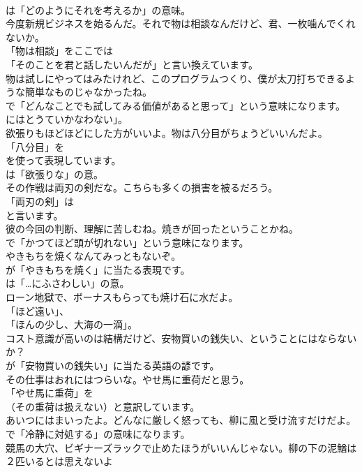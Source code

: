 \documentclass[8pt]{extreport}
\begin{document}
\begin{CJK}{UTF8}{min}
\\	は「どのようにそれを考えるか」の意味。	
\\	今度新規ビジネスを始るんだ。それで物は相談なんだけど、君、一枚噛んでくれないか。 
\\	「物は相談」をここでは
\\	「そのことを君と話したいんだが」と言い換えています。	
\\	物は試しにやってはみたけれど、このプログラムつくり、僕が太刀打ちできるような簡単なものじゃなかったね。 
\\	で「どんなことでも試してみる価値があると思って」という意味になります。
\\	にはとうていかなわない」。	
\\	欲張りもほどほどにした方がいいよ。物は八分目がちょうどいいんだよ。 
\\	「八分目」を
\\	を使って表現しています。
\\	は「欲張りな」の意。	
\\	その作戦は両刃の剣だな。こちらも多くの損害を被るだろう。 
\\	「両刃の剣」は 
\\	と言います。	
\\	彼の今回の判断、理解に苦しむね。焼きが回ったということかね。 
\\	で「かつてほど頭が切れない」という意味になります。	
\\	やきもちを焼くなんてみっともないぞ。 
\\	が「やきもちを焼く」に当たる表現です。
\\	は「…にふさわしい」の意。	
\\	ローン地獄で、ボーナスもらっても焼け石に水だよ。 
\\	「ほど遠い」、
\\	「ほんの少し、大海の一滴」。	
\\	コスト意識が高いのは結構だけど、安物買いの銭失い、ということにはならないか？ 
\\	が「安物買いの銭失い」に当たる英語の諺です。	
\\	その仕事はおれにはつらいな。やせ馬に重荷だと思う。 
\\	「やせ馬に重荷」を
\\	（その重荷は扱えない）と意訳しています。	
\\	あいつにはまいったよ。どんなに厳しく怒っても、柳に風と受け流すだけだよ。 
\\	で「冷静に対処する」の意味になります。	
\\	競馬の大穴、ビギナーズラックで止めたほうがいいんじゃない。柳の下の泥鰌は２匹いるとは思えないよ 

\end{CJK}
\end{document}
